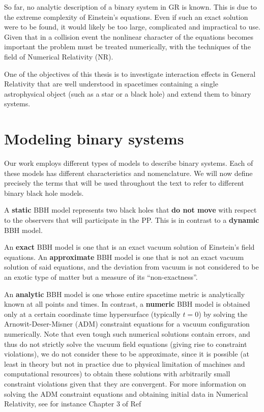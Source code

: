 So far, no analytic description of a binary system in \ac{GR} is known. This is due to the extreme complexity of Einstein's equations. Even if such an exact solution were to be found, it would likely be too large, complicated and impractical to use. Given that in a collision event the nonlinear character of the equations becomes important the problem must be treated numerically, with the techniques of the field of Numerical Relativity (\ac{NR}).

One of the objectives of this thesis is to investigate interaction effects in General Relativity that are well understood in spacetimes containing a single astrophysical object (such as a star or a black hole) and extend them to binary systems.

\section{Modeling binary systems}

Our work employs different types of models to describe binary systems. Each of these models has different characteristics and nomenclature.  We will now define precisely the terms that will be used throughout the text to refer to different binary black hole models.

\begin{definition}
  A \textbf{static} \ac{BBH} model represents two black holes that \textbf{do not move} with respect to the observers that will participate in the \ac{PP}. This is in contrast to a \textbf{dynamic} \ac{BBH} model.
\end{definition}

\begin{definition}
  An \textbf{exact} \ac{BBH} model is one that is an exact vacuum solution of Einstein's field equations. An \textbf{approximate} \ac{BBH} model is one that is not an exact vacuum solution of said equations, and the deviation from vacuum is not considered to be an exotic type of matter but a measure of its ``non-exactness''.
\end{definition}

\begin{definition}
  An \textbf{analytic} \ac{BBH} model is one whose entire spacetime metric is analytically known at all points and times. In contrast, a \textbf{numeric} \ac{BBH} model is obtained only at a certain coordinate time hypersurface (typically $t=0$) by solving the Arnowit-Deser-Misner (\ac{ADM}) constraint equations for a vacuum configuration numerically. Note that even tough such numerical solutions contain errors, and thus do not strictly solve the vacuum field equations (giving rise to constraint violations), we do not consider these to be approximate, since it is possible (at least in theory but not in practice due to physical limitation of machines and computational resources) to obtain these solutions with arbitrarily small constraint violations given that they are convergent. For more information on solving the \ac{ADM} constraint equations and obtaining initial data in Numerical Relativity, see for instance Chapter 3 of Ref~\cite{Alcubierre2012-xp}
\end{definition}

